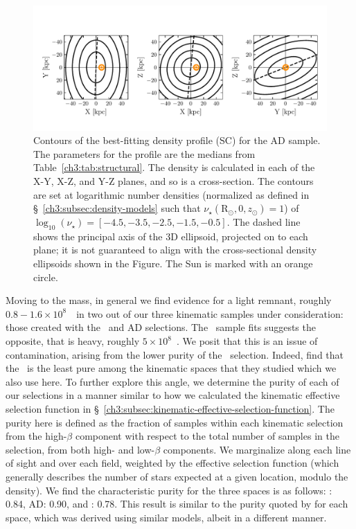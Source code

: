 \begin{figure}
    \centering
    \includegraphics[width=\textwidth]{figure/ch3/contour.pdf}
    \caption{Contours of the best-fitting density profile (SC) for the AD sample. The parameters for the profile are the medians from Table~\ref{ch3:tab:structural}. The density is calculated in each of the X-Y, X-Z, and Y-Z planes, and so is a cross-section. The contours are set at logarithmic number densities (normalized as defined in \S~\ref{ch3:subsec:density-models} such that $\nu_{\star}(\mathrm{R}_{\odot},0,z_{\odot})=1$) of $\log_{10}(\nu_\mathrm{\star}) = [-4.5,-3.5,-2.5,-1.5,-0.5]$. The dashed line shows the principal axis of the 3D ellipsoid, projected on to each plane; it is not guaranteed to align with the cross-sectional density ellipsoids shown in the Figure. The Sun is marked with an orange circle. }
    \label{ch3:fig:pcontour}
\end{figure}

Moving to the mass, in general we find evidence for a light \gse remnant, roughly $0.8-1.6\times 10^{8}$~\Msun\, in two out of our three kinematic samples under consideration: those created with the \eLz\ and AD selections. The \JRLz\ sample fits suggests the opposite, that \gse is heavy, roughly $5\times 10^{8}$~\Msun. We posit that this is an issue of contamination, arising from the lower purity of the \JRLz\ selection. Indeed, \cite{lane22} find that the \JRLz\ is the least pure among the kinematic spaces that they studied which we also use here. To further explore this angle, we determine the purity of each of our selections in a manner similar to how we calculated the kinematic effective selection function in \S~\ref{ch3:subsec:kinematic-effective-selection-function}. The purity here is defined as the fraction of samples within each kinematic selection from the high-$\beta$ component with respect to the total number of samples in the selection, from both high- and low-$\beta$ components. We marginalize along each line of sight and over each field, weighted by the effective selection function (which generally describes the number of stars expected at a given location, modulo the density). We find the characteristic purity for the three spaces is as follows: \eLz: 0.84, AD: 0.90, and \JRLz: 0.78. This result is similar to the purity quoted by \cite{lane22} for each space, which was derived using similar models, albeit in a different manner.

